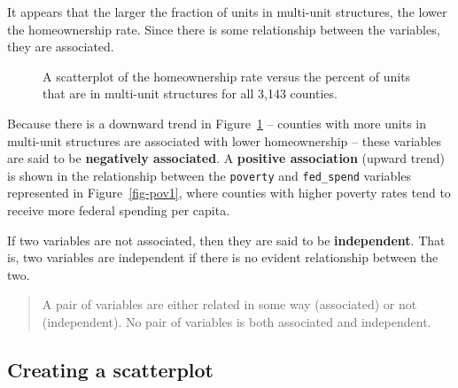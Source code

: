 \documentclass[
  letterpaper,
  DIV=11,
  numbers=noendperiod]{scrreprt}
\begin{document}
It appears that the larger the fraction of units in multi-unit
structures, the lower the homeownership rate. Since there is some
relationship between the variables, they are associated.

\begin{figure}


\caption{\label{fig-homeown}A scatterplot of the homeownership rate
versus the percent of units that are in multi-unit structures for all
3,143 counties.}

\end{figure}%

Because there is a downward trend in Figure~\ref{fig-homeown} --
counties with more units in multi-unit structures are associated with
lower homeownership -- these variables are said to be \textbf{negatively
associated}. A \textbf{positive association} (upward trend) is shown in
the relationship between the \texttt{poverty} and \texttt{fed\_spend}
variables represented in Figure~\ref{fig-pov1}, where counties with
higher poverty rates tend to receive more federal spending per capita.

If two variables are not associated, then they are said to be
\textbf{independent}. That is, two variables are independent if there is
no evident relationship between the two.

\begin{quote}
A pair of variables are either related in some way (associated) or not
(independent). No pair of variables is both associated and independent.
\end{quote}

\subsection{Creating a scatterplot}\label{creating-a-scatterplot}
\end{document}
